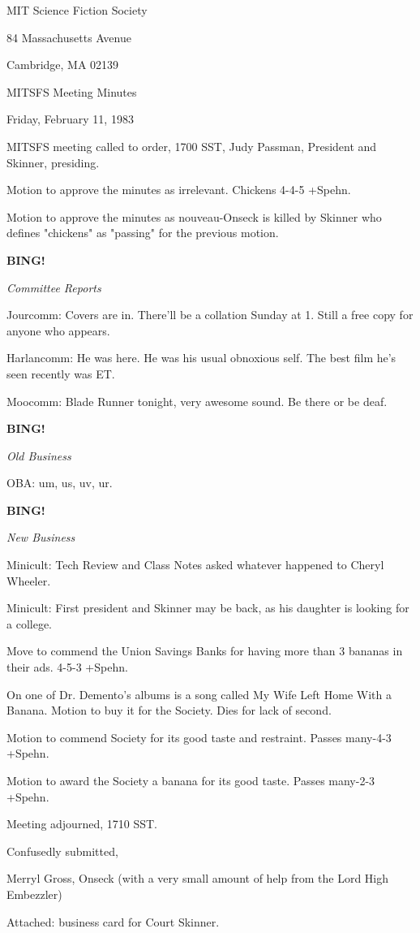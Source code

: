 \documentclass[12pt]{article}
\newcommand{\bing}{{\bf BING!} }
\newcommand{\goto}[1]{\bing \vskip 12pt \centerline{{\em{#1}}}}
\begin{document}
\begin{center}

MIT Science Fiction Society 

84 Massachusetts Avenue

Cambridge, MA 02139

\vspace{12pt}

MITSFS Meeting Minutes 

Friday, February 11, 1983

\end{center}
 
\vspace{18pt}

\setlength{\parskip}{6pt}

\noindent
MITSFS meeting called to order, 1700 SST,
Judy Passman, President and Skinner, presiding.

Motion to approve the minutes as irrelevant. Chickens 4-4-5 +Spehn.

Motion to approve the minutes as nouveau-Onseck is killed by Skinner who defines "chickens" as "passing" for the previous motion.

\goto{Committee Reports}

Jourcomm: Covers are in. There'll be a collation Sunday at 1. Still a free copy for anyone who appears.

Harlancomm: He was here. He was his usual obnoxious self. The best film he's seen recently was ET.

Moocomm: Blade Runner tonight, very awesome sound. Be there or be deaf.

\goto{Old Business}

OBA: um, us, uv, ur.

\goto{New Business}

Minicult: Tech Review and Class Notes asked whatever happened to Cheryl Wheeler.

Minicult: First president and Skinner may be back, as his daughter is looking for a college.

Move to commend the Union Savings Banks for having more than 3 bananas in their ads. 4-5-3 +Spehn.

On one of Dr. Demento's albums is a song called My Wife Left Home With a Banana. Motion to buy it for the Society. Dies for lack of second.

Motion to commend Society for its good taste and restraint. Passes many-4-3 +Spehn.

Motion to award the Society a banana for its good taste. Passes many-2-3 +Spehn.

\vspace{12pt}

\noindent
Meeting adjourned, 1710 SST.

\vspace{18pt}

\centerline{Confusedly submitted,}
\centerline{Merryl Gross, Onseck (with a very small amount of help from the Lord High Embezzler)}

Attached: business card for Court Skinner.
\end{document}
